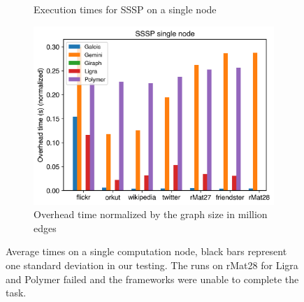 \begin{figure}[ht!]
\begin{subfigure}{0.3\textwidth}
		\caption{Execution times for SSSP on a single node}
		\label{fig:singleNodeSSSP_exec}
	\end{subfigure}
	\hfil
	\begin{subfigure}{0.3\textwidth}
		\includegraphics[width=\linewidth]{../../plots/singleNodeSSSP_overheadTimeNormalized.png}
		\caption{Overhead time normalized by the graph size in million edges}
		\label{fig:singleNodeSSSP_overheadNormalized}
	\end{subfigure}
	\caption{Average times on a single computation node, black bars represent one standard deviation in our testing.
	The runs on rMat28 for Ligra and Polymer failed and the frameworks were unable to complete the task.}
	\label{fig:singleNodeSSSP}
\end{figure}








